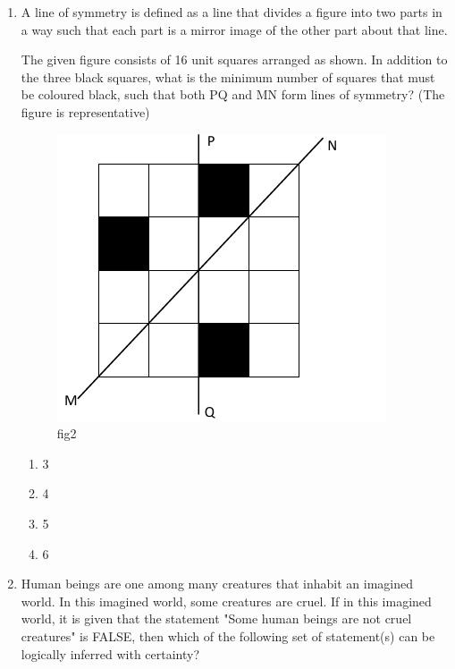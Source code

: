 \documentclass[journal,12pt,onecolumn]{IEEEtran}
\theoremstyle{remark}
\begin{document}
\begin{enumerate}
When he was younger, he was also a poet. He did not win any medals in the International Mathematics Olympiads. He dropped out of college.

Based only on the above information, which one of the following statements can be logically inferred with certainty?

\begin{multicols}{2}
\begin{enumerate}
    \item Every Fields medalist has won a medal in an International Mathematics Olympiad.
    \item Everyone who has dropped out of college has won the Fields medal.
    \item All Fields medalists are part-time poets.
    \item Some Fields medalists have dropped out of college.
\end{enumerate}
\end{multicols}
\hfill{GATE 2023 PI}

\item A line of symmetry is defined as a line that divides a figure into two parts in a way such that each part is a mirror image of the other part about that line.

The given figure consists of 16 unit squares arranged as shown. In addition to the three black squares, what is the minimum number of squares that must be coloured black, such that both PQ and MN form lines of symmetry? (The figure is representative)
\begin{figure}[H]
    \centering
    \includegraphics[width=0.5\linewidth]{figs/Q.5.png}
    \caption{fig2}
    \label{fig:figs/Q.5.png}
\end{figure}
\begin{multicols}{4}
    \begin{enumerate}
        \item 3
        \item 4
        \item 5
        \item 6
        \end{enumerate}
\end{multicols}
\item Human beings are one among many creatures that inhabit an imagined world. In this imagined world, some creatures are cruel. If in this imagined world, it is given that the statement "Some human beings are not cruel creatures" is FALSE, then which of the following set of statement(s) can be logically inferred with certainty?
\begin{enumerate}
    


\end{enumerate}
\end{enumerate}
\end{document}
